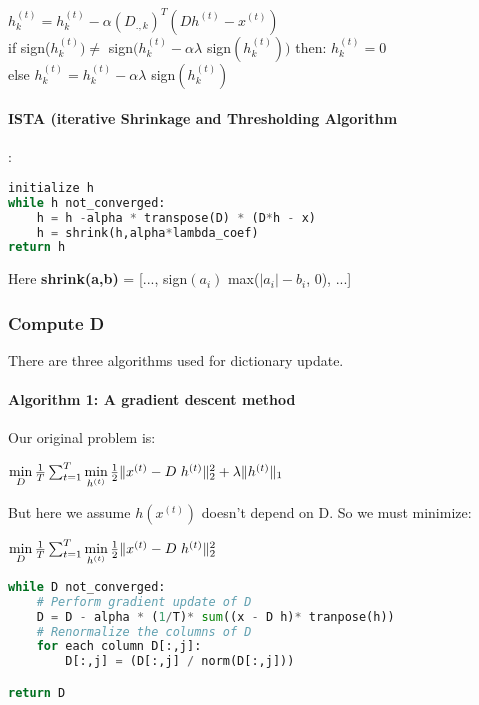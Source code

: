 \documentclass[a4paper,10pt]{article}
\begin{document}
$h^{(t)}_k = h^{(t)}_k   - \alpha (D_{., k})^T (D h^{(t)} - x^{(t)})$\\
\indent if  sign($h^{(t)}_k) \neq$ sign$(h^{(t)}_k - \alpha \lambda$ sign$(h^{(t)}_k) )$ then: $h^{(t)}_k = 0$\\
\indent else $h^{(t)}_k = h^{(t)}_k - \alpha \lambda$ sign$(h^{(t)}_k)$
\paragraph{ISTA (iterative Shrinkage and Thresholding Algorithm}
:
\begin{lstlisting}[language=Python,frame=single]
initialize h 
while h not_converged:
    h = h -alpha * transpose(D) * (D*h - x)
    h = shrink(h,alpha*lambda_coef)
return h
\end{lstlisting}
Here \textbf{shrink(a,b) }= [..., sign$(a_i)$ max($|a_i| - b_i$, 0), ...]\\

\subsubsection{Compute D}
There are three algorithms used for  dictionary update.
\paragraph{Algorithm 1: A gradient descent method}
Our original problem is:
\begin{center}
 $\min\limits_{D} \frac{1}{T} \sum_{t=1}^{T}  \min\limits_{h^{(t)}} \frac{1}{2} \| x^{(t)} - D \hspace{3px} h^{(t)} \|_2^2 + \lambda \|h^{(t)} \|_1$\\
\end{center}
But here we assume $h(x^{(t)})$ doesn't depend on D. So we must minimize:
\begin{center}
 $\min\limits_{D} \frac{1}{T} \sum_{t=1}^{T}  \min\limits_{h^{(t)}} \frac{1}{2} \| x^{(t)} - D \hspace{3px} h^{(t)} \|_2^2 $\\
\end{center}
\begin{lstlisting}[language=Python,frame=single]
while D not_converged:
    # Perform gradient update of D
    D = D - alpha * (1/T)* sum((x - D h)* tranpose(h))
    # Renormalize the columns of D
    for each column D[:,j]:
        D[:,j] = (D[:,j] / norm(D[:,j]))

return D
\end{lstlisting}
\end{document}
